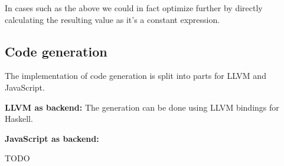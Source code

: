 In cases such as the above we could in fact optimize further by directly  calculating the resulting value as it's a constant expression.


\subsection{Code generation}
The implementation of code generation is split into parts for LLVM and JavaScript.

\textbf{LLVM as backend:} The generation can be done using LLVM
bindings for Haskell.

\textbf{JavaScript as backend:}

TODO